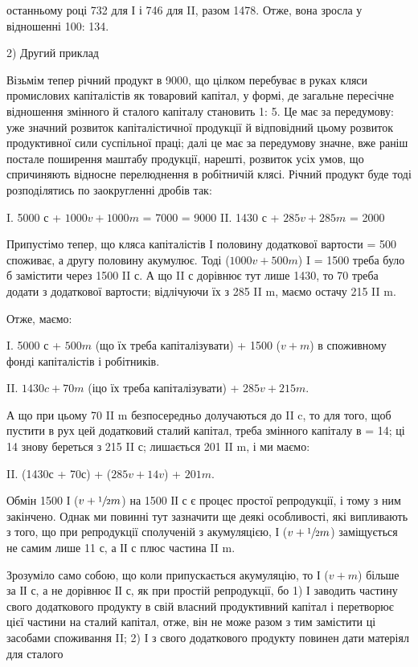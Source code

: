 \parcont{}  %
останньому році 732 для І і 746 для II, разом 1478. Отже, вона
зросла у відношенні 100: 134.

2) Другий приклад

Візьмім тепер річний продукт в 9000, що цілком перебуває в руках
кляси промислових капіталістів як товаровий капітал, у формі, де загальне
пересічне відношення змінного й сталого капіталу становить 1: 5.
Це має за передумову: уже значний розвиток капіталістичної продукції
й відповідний цьому розвиток продуктивної сили суспільної праці; далі
це має за передумову значне, вже раніш постале поширення маштабу
продукції, нарешті, розвиток усіх умов, що спричиняють відносне перелюднення
в робітничій клясі. Річний продукт буде тоді розподілятись по
заокругленні дробів так:

I.  5000 с + $1000 v + 1000 m$ = 7000  = 9000
II. 1430 с + $285 v + 285 m$ = 2000

Припустімо тепер, що кляса капіталістів І половину додаткової вартости
= 500 споживає, а другу половину акумулює. Тоді ($1000 v +
500 m$) I = 1500 треба було б замістити через 1500 II с. А що II с
дорівнює тут лише 1430, то 70 треба додати з додаткової вартости;
відлічуючи їх з 285 II m, маємо остачу 215 II m.

Отже, маємо:

I.  5000 с + $500 m$ (що їх треба капіталізувати) + 1500 ($v + m$) в споживному
фонді капіталістів і робітників.

II.  $1430 c + 70 m$ (іцо їх треба капіталізувати) + $285 v + 215 m$.

А що при цьому 70 II m безпосередньо долучаються до II c, то для
того, щоб пустити в рух цей додатковий сталий капітал, треба змінного
капіталу в  = 14; ці 14 знову береться з 215 II с; лишається 201 II m,
і ми маємо:

II. (1430с + 70с) + ($285 v + 14 v$) + $201 m$.

Обмін 1500 І ($v + \sfrac{1}{2} m$) на 1500 ІІ с є процес простої репродукції,
і тому з ним закінчено. Однак ми повинні тут зазначити ще деякі особливості,
які випливають з того, що при репродукції сполученій з акумуляцією,
І ($v + \sfrac{1}{2} m$) заміщується не самим лише 11 с, а ІІ с плюс частина
II m.

Зрозуміло само собою, що коли припускається акумуляцію, то І ($v + m$)
більше за ІІ с, а не дорівнює ІІ с, як при простій репродукції, бо
1) І заводить частину свого додаткового продукту в свій власний
продуктивний капітал і перетворює  цієї частини на сталий капітал,
отже, він не може разом з тим замістити ці  засобами споживання II;
2) І з свого додаткового продукту повинен дати матеріял для сталого
\parbreak{}  %
